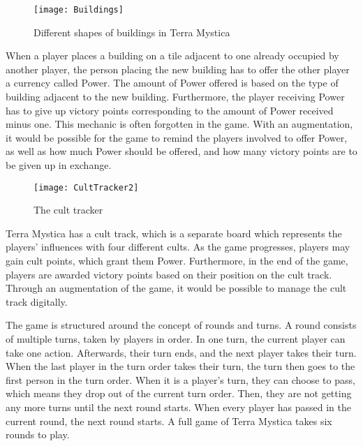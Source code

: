 \begin{figure}[h!]
\centering \texttt{[image: Buildings]}
\caption{Different shapes of buildings in Terra Mystica \label{Fig:Buildings}}
\end{figure}

When a player places a building on a tile adjacent to one already occupied by another player, the person placing the new building has to offer the other player a currency called Power. The amount of Power offered is based on the type of building adjacent to the new building. Furthermore, the player receiving Power has to give up victory points corresponding to the amount of Power received minus one. This mechanic is often forgotten in the game. With an augmentation, it would be possible for the game to remind the players involved to offer Power, as well as how much Power should be offered, and how many victory points are to be given up in exchange.

\begin{figure}[h!]
\centering \texttt{[image: CultTracker2]}
\caption{The cult tracker \label{Fig:CultTracker}}
\end{figure}

Terra Mystica has a cult track, which is a separate board which represents the players' influences with four different cults. As the game progresses, players may gain cult points, which grant them Power. Furthermore, in the end of the game, players are awarded victory points based on their position on the cult track. Through an augmentation of the game, it would be possible to manage the cult track digitally.

The game is structured around the concept of rounds and turns. A round consists of multiple turns, taken by players in order. In one turn, the current player can take one action. Afterwards, their turn ends, and the next player takes their turn. When the last player in the turn order takes their turn, the turn then goes to the first person in the turn order. When it is a player's turn, they can choose to pass, which means they drop out of the current turn order. Then, they are not getting any more turns until the next round starts. When every player has passed in the current round, the next round starts. A full game of Terra Mystica takes six rounds to play.